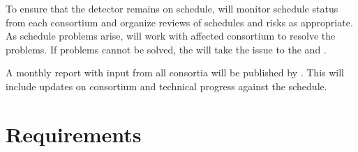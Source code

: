 To ensure that the  detector remains on schedule,
 will monitor schedule status from each consortium and organize
reviews of schedules and risks as appropriate.  As schedule problems
arise,  will work with affected consortium to resolve the
problems. If problems cannot be solved, the  will take the issue to the
 and .

A monthly report with input from all consortia will be published by
. This will include updates on consortium and 
technical progress against the schedule.


\section{Requirements}
\label{sec:fdsp-coord-requirements}

